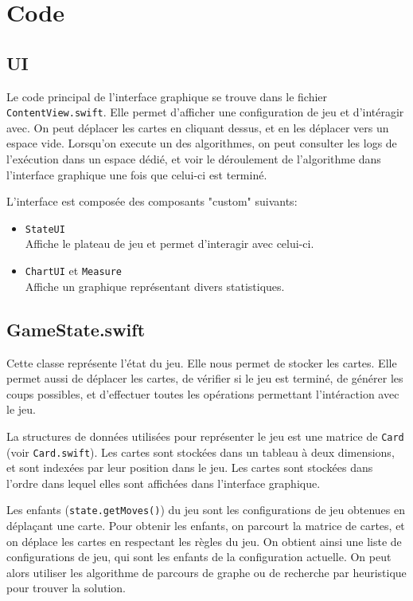 \chapter{Code}

\section{UI}
Le code principal de l'interface graphique se trouve dans le fichier \texttt{ContentView.swift}. Elle permet d'afficher une configuration de jeu et d'intéragir avec. On peut déplacer les cartes en cliquant dessus, et en les déplacer vers un espace vide. Lorsqu'on execute un des algorithmes, on peut consulter les logs de l'exécution dans un espace dédié, et voir le déroulement de l'algorithme dans l'interface graphique une fois que celui-ci est terminé.

L'interface est composée des composants "custom" suivants:
\begin{itemize}
      \item \texttt{StateUI} \\
            Affiche le plateau de jeu et permet d'interagir avec celui-ci.
      \item \texttt{ChartUI} et \texttt{Measure} \\
            Affiche un graphique représentant divers statistiques.
\end{itemize}

\section{GameState.swift}
Cette classe représente l'état du jeu. Elle nous permet de stocker les cartes. Elle permet aussi de déplacer les cartes, de vérifier si le jeu est terminé, de générer les coups possibles, et d'effectuer toutes les opérations permettant l'intéraction avec le jeu.

La structures de données utilisées pour représenter le jeu est une matrice de \texttt{Card} (voir \texttt{Card.swift}). Les cartes sont stockées dans un tableau à deux dimensions, et sont indexées par leur position dans le jeu. Les cartes sont stockées dans l'ordre dans lequel elles sont affichées dans l'interface graphique.

\pagebreak

Les enfants (\texttt{state.getMoves()}) du jeu sont les configurations de jeu obtenues en déplaçant une carte. Pour obtenir les enfants, on parcourt la matrice de cartes, et on déplace les cartes en respectant les règles du jeu. On obtient ainsi une liste de configurations de jeu, qui sont les enfants de la configuration actuelle. On peut alors utiliser les algorithme de parcours de graphe ou de recherche par heuristique pour trouver la solution.

